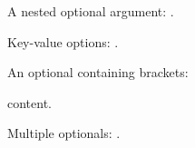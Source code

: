 A nested optional argument: .

Key-value options: .

An optional containing brackets: \item[{[bracketed] label}] content.

Multiple optionals: \newcommand{\x}[2][default]{#1 and #2}.
